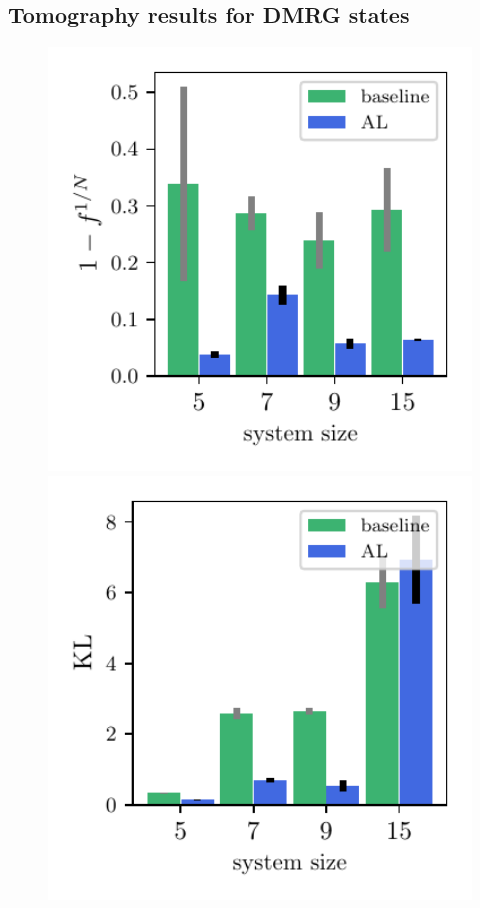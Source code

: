 \documentclass[pra,aps,showpacs,groupedaddress,superscriptaddress,twocolumn,toc=flat,biblatex,footinbib]{revtex4-1}
\begin{document}
\subsection{Tomography results for DMRG states}
\begin{figure}[t]
	\centering
\begin{minipage}[t]{0.23\textwidth}
   \includegraphics[width=1\textwidth]{Paper/Graphics/GHZ_rescaled_fidelity.pdf}
\end{minipage}
\begin{minipage}[t]{0.23\textwidth}
   \includegraphics[width=1\textwidth]{Paper/Graphics/GHZ_KL.pdf}

\end{minipage}
\end{figure}
\end{document}
